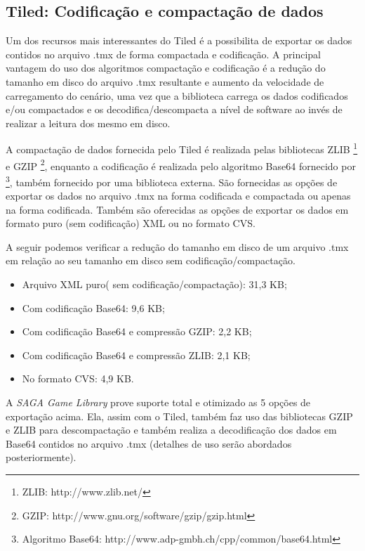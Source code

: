 \subsection{Tiled: Codificação e compactação de dados}
%
%
Um dos recursos mais interessantes do Tiled é a possibilita de exportar os dados contidos no arquivo .tmx de forma compactada e codificação. 
A principal vantagem do uso dos algoritmos compactação e codificação é a redução do tamanho em disco do arquivo .tmx resultante e aumento da velocidade de carregamento do cenário, uma vez que a biblioteca carrega os dados codificados e/ou compactados e os decodifica/descompacta a nível de software ao invés de realizar a leitura dos mesmo em disco. 
\par 
A compactação de dados fornecida pelo Tiled é realizada pelas bibliotecas ZLIB \footnote{ZLIB: http://www.zlib.net/} e GZIP \footnote{GZIP: http://www.gnu.org/software/gzip/gzip.html}, enquanto a codificação é realizada pelo algoritmo Base64 fornecido por \footnote{Algoritmo Base64: http://www.adp-gmbh.ch/cpp/common/base64.html}, também fornecido por uma biblioteca externa.
São fornecidas as opções de exportar os dados no arquivo .tmx na forma codificada e compactada ou apenas na forma codificada. Também são oferecidas as opções de exportar os dados em formato puro (sem codificação) XML ou no formato CVS. 
\par 
A seguir podemos verificar a redução do tamanho em disco de um arquivo .tmx em relação ao seu tamanho em disco sem codificação/compactação.
%
\begin{itemize}
 \item Arquivo XML puro( sem codificação/compactação): 31,3 KB;
 \item Com codificação Base64: 9,6 KB;
 \item Com codificação Base64 e compressão GZIP: 2,2 KB;
 \item Com codificação Base64 e compressão ZLIB: 2,1 KB;
 \item No formato CVS: 4,9 KB.
\end{itemize}
%
A \textit{SAGA Game Library} prove suporte total e otimizado as 5 opções de exportação acima. Ela, assim com o Tiled, também faz
uso das bibliotecas GZIP e ZLIB para descompactação e também realiza a decodificação dos dados em Base64 contidos no arquivo .tmx (detalhes de uso serão abordados posteriormente).
%
%
%
%


